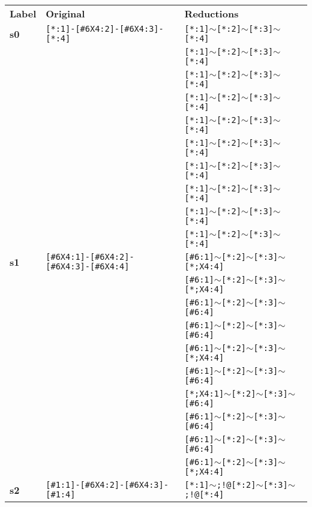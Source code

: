 \renewcommand{\arraystretch}{1.2}
\begin{longtable}{>{\baselineskip=10pt}p{} >{\baselineskip=10pt}p{} >{\baselineskip=10pt}p{}} 
\multicolumn{3}{c}{Proper Torsion parameters in AlkEthOH} \\ 
\hline 
\textbf{Label} & \textbf{Original} & \textbf{Reductions} \\ 
\hline 
\endhead\textbf{s0} & \texttt{[*:1]-[\#6X4:2]-[\#6X4:3]-[*:4]} & \texttt{[*:1]$\sim$[*:2]$\sim$[*:3]$\sim$[*:4]} \\ 
 &  & \texttt{[*:1]$\sim$[*:2]$\sim$[*:3]$\sim$[*:4]} \\ 
 &  & \texttt{[*:1]$\sim$[*:2]$\sim$[*:3]$\sim$[*:4]} \\ 
 &  & \texttt{[*:1]$\sim$[*:2]$\sim$[*:3]$\sim$[*:4]} \\ 
 &  & \texttt{[*:1]$\sim$[*:2]$\sim$[*:3]$\sim$[*:4]} \\ 
 &  & \texttt{[*:1]$\sim$[*:2]$\sim$[*:3]$\sim$[*:4]} \\ 
 &  & \texttt{[*:1]$\sim$[*:2]$\sim$[*:3]$\sim$[*:4]} \\ 
 &  & \texttt{[*:1]$\sim$[*:2]$\sim$[*:3]$\sim$[*:4]} \\ 
 &  & \texttt{[*:1]$\sim$[*:2]$\sim$[*:3]$\sim$[*:4]} \\ 
 &  & \texttt{[*:1]$\sim$[*:2]$\sim$[*:3]$\sim$[*:4]} \\ 
\hline 
\textbf{s1} & \texttt{[\#6X4:1]-[\#6X4:2]-[\#6X4:3]-[\#6X4:4]} & \texttt{[\#6:1]$\sim$[*:2]$\sim$[*:3]$\sim$[*;X4:4]} \\ 
 &  & \texttt{[\#6:1]$\sim$[*:2]$\sim$[*:3]$\sim$[*;X4:4]} \\ 
 &  & \texttt{[\#6:1]$\sim$[*:2]$\sim$[*:3]$\sim$[\#6:4]} \\ 
 &  & \texttt{[\#6:1]$\sim$[*:2]$\sim$[*:3]$\sim$[\#6:4]} \\ 
 &  & \texttt{[\#6:1]$\sim$[*:2]$\sim$[*:3]$\sim$[*;X4:4]} \\ 
 &  & \texttt{[\#6:1]$\sim$[*:2]$\sim$[*:3]$\sim$[\#6:4]} \\ 
 &  & \texttt{[*;X4:1]$\sim$[*:2]$\sim$[*:3]$\sim$[\#6:4]} \\ 
 &  & \texttt{[\#6:1]$\sim$[*:2]$\sim$[*:3]$\sim$[\#6:4]} \\ 
 &  & \texttt{[\#6:1]$\sim$[*:2]$\sim$[*:3]$\sim$[\#6:4]} \\ 
 &  & \texttt{[\#6:1]$\sim$[*:2]$\sim$[*:3]$\sim$[*;X4:4]} \\ 
\hline 
\textbf{s2} & \texttt{[\#1:1]-[\#6X4:2]-[\#6X4:3]-[\#1:4]} & \texttt{[*:1]$\sim$;!@[*:2]$\sim$[*:3]$\sim$;!@[*:4]} \\ 

\end{longtable}
